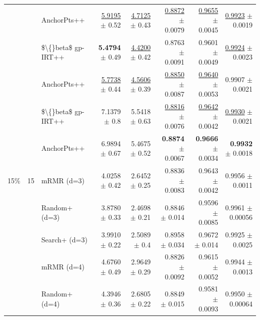 \begin{longtable}{llp{}rrrrr}
 &  & AnchorPts++ & \underline{5.9195} {\scriptsize $\pm$ 0.52} & \underline{4.7125} {\scriptsize $\pm$ 0.43} & \underline{0.8872} {\scriptsize $\pm$ 0.0079} & \underline{0.9655} {\scriptsize $\pm$ 0.0045} & \underline{0.9923} {\scriptsize $\pm$ 0.0019} \\
 &  & \$\textbackslash\{\}beta\$ gp-IRT++ & \textbf{5.4794} {\scriptsize $\pm$ 0.49} & \underline{4.4200} {\scriptsize $\pm$ 0.42} & 0.8763 {\scriptsize $\pm$ 0.0091} & 0.9601 {\scriptsize $\pm$ 0.0049} & \underline{0.9924} {\scriptsize $\pm$ 0.0023} \\
 &  & AnchorPts++ & \underline{5.7738} {\scriptsize $\pm$ 0.44} & \underline{4.5606} {\scriptsize $\pm$ 0.39} & \underline{0.8850} {\scriptsize $\pm$ 0.0087} & \underline{0.9640} {\scriptsize $\pm$ 0.0053} & 0.9907 {\scriptsize $\pm$ 0.0021} \\
 &  & \$\textbackslash\{\}beta\$ gp-IRT++ & 7.1379 {\scriptsize $\pm$ 0.8} & 5.5418 {\scriptsize $\pm$ 0.63} & \underline{0.8816} {\scriptsize $\pm$ 0.0076} & \underline{0.9642} {\scriptsize $\pm$ 0.0042} & \underline{0.9930} {\scriptsize $\pm$ 0.0021} \\
 &  & AnchorPts++ & 6.9894 {\scriptsize $\pm$ 0.67} & 5.4675 {\scriptsize $\pm$ 0.52} & \textbf{0.8874} {\scriptsize $\pm$ 0.0067} & \textbf{0.9666} {\scriptsize $\pm$ 0.0034} & \textbf{0.9932} {\scriptsize $\pm$ 0.0018} \\
\midrule
15\% & 15 & mRMR (d=3) & 4.0258 {\scriptsize $\pm$ 0.42} & 2.6452 {\scriptsize $\pm$ 0.25} & 0.8836 {\scriptsize $\pm$ 0.0083} & 0.9643 {\scriptsize $\pm$ 0.0042} & 0.9956 {\scriptsize $\pm$ 0.0011} \\
 &  & Random+ (d=3) & 3.8780 {\scriptsize $\pm$ 0.33} & 2.4698 {\scriptsize $\pm$ 0.21} & 0.8846 {\scriptsize $\pm$ 0.014} & 0.9596 {\scriptsize $\pm$ 0.0085} & 0.9961 {\scriptsize $\pm$ 0.00056} \\
 &  & Search+ (d=3) & 3.9910 {\scriptsize $\pm$ 0.22} & 2.5089 {\scriptsize $\pm$ 0.4} & 0.8958 {\scriptsize $\pm$ 0.034} & 0.9672 {\scriptsize $\pm$ 0.014} & 0.9925 {\scriptsize $\pm$ 0.0025} \\
 &  & mRMR (d=4) & 4.6760 {\scriptsize $\pm$ 0.49} & 2.9649 {\scriptsize $\pm$ 0.29} & 0.8826 {\scriptsize $\pm$ 0.0092} & 0.9615 {\scriptsize $\pm$ 0.0052} & 0.9944 {\scriptsize $\pm$ 0.0013} \\
 &  & Random+ (d=4) & 4.3946 {\scriptsize $\pm$ 0.36} & 2.6805 {\scriptsize $\pm$ 0.22} & 0.8849 {\scriptsize $\pm$ 0.015} & 0.9581 {\scriptsize $\pm$ 0.0093} & 0.9950 {\scriptsize $\pm$ 0.00064} \\

\end{longtable}
